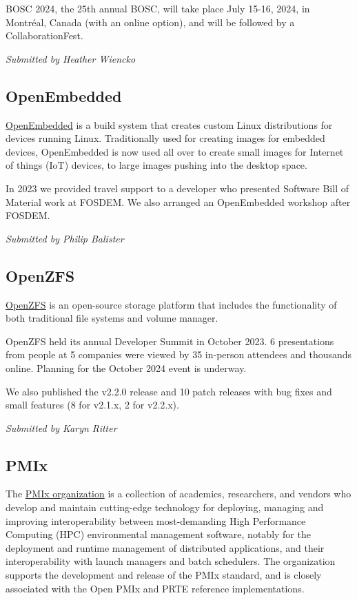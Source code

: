 \documentclass[a4paper]{report}
\begin{document}
BOSC 2024, the 25th annual BOSC, will take place July 15-16, 2024, in Montréal, Canada (with an online option), and will be followed by a CollaborationFest.

{\em Submitted by Heather Wiencko}

\subsection{OpenEmbedded}

\href{https://www.openembedded.org/}{OpenEmbedded} is a build system that creates custom Linux distributions for devices running Linux. Traditionally used for creating images for embedded devices, OpenEmbedded is now used all over to create small images for Internet of things (IoT) devices, to large images pushing into the desktop space.

In 2023 we provided travel support to a developer who presented Software Bill of Material work at FOSDEM. We also arranged an OpenEmbedded workshop after FOSDEM.

{\em Submitted by Philip Balister}

\subsection{OpenZFS}

\href{https://openzfs.org/}{OpenZFS} is an open-source storage platform that includes the functionality of both traditional file systems and volume manager.

OpenZFS held its annual Developer Summit in October 2023. 6 presentations from people at 5 companies were viewed by 35 in-person attendees and thousands online. Planning for the October 2024 event is underway.

We also published the v2.2.0 release and 10 patch releases with bug fixes and small features (8 for v2.1.x, 2 for v2.2.x).

{\em Submitted by Karyn Ritter}

\subsection{PMIx}

The \href{https://pmix.github.io/}{PMIx organization} is a collection of academics, researchers, and vendors who develop and maintain cutting-edge technology for deploying, managing and improving interoperability between most-demanding High Performance Computing (HPC) environmental management software, notably for the deployment and runtime management of distributed applications, and their interoperability with launch managers and batch schedulers. The organization supports the development and release of the PMIx standard, and is closely associated with the Open PMIx and PRTE reference implementations.
\end{document}
